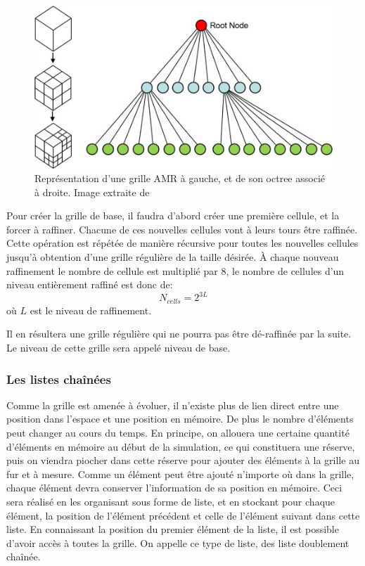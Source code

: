 \begin{figure}
        \includegraphics[width=.95\linewidth]{img/02/octree.jpg} 
        \caption[Grille AMR et son octree]{Représentation d'une grille AMR à gauche, et de son octree associé à droite. 
        Image extraite de \cite{SU201659}
     	\label{fig:octree}
}
\end{figure}

Pour créer la grille de base, il faudra d'abord créer une première cellule, et la forcer à raffiner.
Chacune de ces nouvelles cellules vont à leurs tours être raffinée.
Cette opération est répétée de manière récursive pour toutes les nouvelles cellules jusqu'à obtention d'une grille régulière de la taille désirée.
À chaque nouveau raffinement le nombre de cellule est multiplié par 8, le nombre de cellules d'un niveau entièrement raffiné est donc de:
\begin{equation}
N_{cells} = 2^{3L}
\end{equation}
où $L$ est le niveau de raffinement.

Il en résultera une grille régulière qui ne pourra pas être dé-raffinée par la suite.
Le niveau de cette grille sera appelé niveau de base.

\subsubsection{Les listes chaînées}

Comme la grille est amenée à évoluer, il n'existe plus de lien direct entre une position dans l'espace et une position en mémoire.
De plus le nombre d'éléments peut changer au cours du temps.
En principe, on allouera une certaine quantité d'éléments en mémoire au début de la simulation, ce qui constituera une réserve, puis on viendra piocher dans cette réserve pour ajouter des éléments à la grille au fur et à mesure.
Comme un élément peut être ajouté n'importe où dans la grille, chaque élément devra conserver l'information de sa position en mémoire.
Ceci sera réalisé en les organisant sous forme de liste, et en stockant pour chaque élément, la position de l'élément précédent et celle de l'élément suivant dans cette liste.
En connaissant la position du premier élément de la liste, il est possible d'avoir accès à toutes la grille.
On appelle ce type de liste, des liste doublement chaînée.

